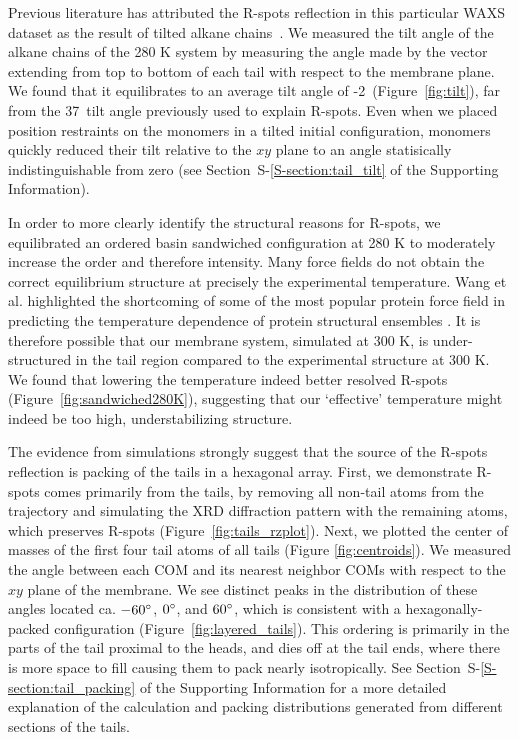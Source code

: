 \documentclass[journal=jpcbfk,manuscript=article]{achemso}
\begin{document}
  Previous literature has attributed the R-spots reflection in this particular
  WAXS dataset as the result of tilted alkane chains~\cite{feng_scalable_2014}.
  We measured the tilt angle of the alkane chains of the 280 K system by measuring
  the angle made by the vector extending from top to bottom of each tail with
  respect to the membrane plane. We found that it equilibrates to an average tilt
  angle of -2\degree~(Figure~\ref{fig:tilt}), 
  far from the 37\degree~tilt angle
  previously used to explain R-spots. Even when we placed position restraints on
  the monomers in a tilted initial configuration, monomers quickly reduced their
  tilt relative to the $xy$ plane to an angle statisically indistinguishable from
  zero (see Section~S-\ref{S-section:tail_tilt} of the Supporting Information). 

  In order to more clearly identify the structural reasons for R-spots, we
  equilibrated an ordered basin sandwiched configuration at 280 K to moderately
  increase the order and therefore intensity.  Many force fields do not obtain
  the correct equilibrium structure at precisely the experimental temperature.
  Wang et al. highlighted the shortcoming of some of the most popular protein
  force field in predicting the temperature dependence of protein structural
  ensembles \cite{wang_building_2017}. It is therefore possible that   %
  our membrane system, simulated at 300 K, is under-structured in the tail region
  compared to the experimental structure at 300 K. We found that lowering the
  temperature indeed better resolved R-spots (Figure~\ref{fig:sandwiched280K}),
  suggesting that our `effective' temperature might indeed be too high,
  understabilizing structure. 

  The evidence from simulations strongly suggest that the source of
  the R-spots reflection is packing of the tails in a hexagonal array.
  First, we demonstrate R-spots comes primarily from the tails, by
  removing all non-tail atoms from the trajectory and simulating the
  XRD diffraction pattern with the remaining atoms, which preserves
  R-spots (Figure~\ref{fig:tails_rzplot}).  Next, we plotted the center
  of masses of the first four tail atoms of all tails (Figure
  \ref{fig:centroids}). We measured the angle between each COM
  and its nearest neighbor COMs with respect to the
  $xy$ plane of the membrane. We see distinct peaks in the
  distribution of these angles located ca. $-60\degree$, $0\degree$,
  and $60\degree$, which is consistent with a hexagonally-packed
  configuration (Figure~\ref{fig:layered_tails}).  This ordering is
  primarily in the parts of the tail proximal to the heads, and dies
  off at the tail ends, where there is more space to fill causing them
  to pack nearly isotropically. See Section~S-\ref{S-section:tail_packing} 
  of the Supporting Information for
  a more detailed explanation of the calculation and packing
  distributions generated from different sections of the tails.
\end{document}
